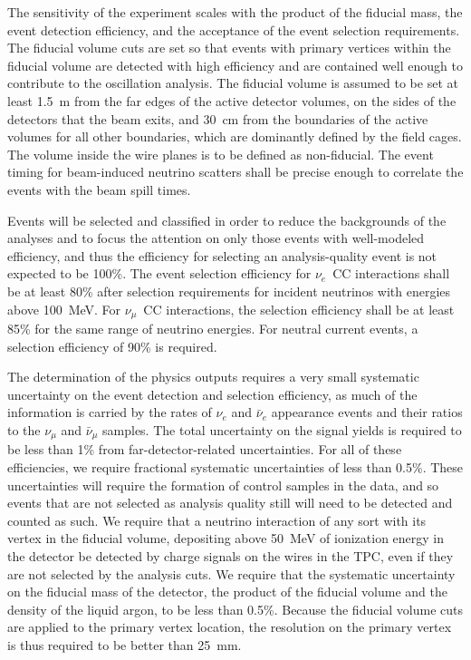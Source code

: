 The sensitivity of the experiment scales with the product of the
fiducial mass, the event detection efficiency, and the acceptance of
the event selection requirements.  The fiducial volume cuts are set so
that events with primary vertices within the fiducial volume are
detected with high efficiency and are contained well enough to
contribute to the oscillation analysis.  The fiducial volume is
assumed to be set at least 1.5~m from the far edges of the active
detector volumes, on the sides of the detectors that the beam exits,
and 30~cm from the boundaries of the active volumes for all other
boundaries, which are dominantly defined by the field cages.  The
volume inside the wire planes is to be defined as non-fiducial.
The event timing for beam-induced neutrino scatters
shall be precise enough to correlate the events with the
beam spill times.  %


Events will be selected and classified in order to reduce the
backgrounds of the analyses and to focus the attention on only those
events with well-modeled efficiency, and thus the efficiency for
selecting an analysis-quality event is not expected to be 100\%.  The
event selection efficiency for $\nu_e$~CC interactions shall be at
least 80\% after selection requirements for incident neutrinos with
energies above 100~MeV.  For $\nu_\mu$~CC interactions, the selection
efficiency shall be at least 85\% for the same range of neutrino
energies.  For neutral current events, a selection efficiency of 90\%
is required.

The determination of the physics outputs requires a very small
systematic uncertainty on the event detection and selection
efficiency, as much of the information is carried by the rates of
$\nu_e$ and $\bar\nu_e$ appearance events and their ratios to the
$\nu_\mu$ and $\bar\nu_\mu$ samples.  The total uncertainty on the
signal yields is required to be less than 1\% from
far-detector-related uncertainties.  For all of these efficiencies, we
require fractional systematic uncertainties of less than 0.5\%.  These
uncertainties will require the formation of control samples in the
data, and so events that are not selected as analysis quality still will
need to be detected and counted as such.  We require that a neutrino
interaction of any sort with its vertex in the fiducial volume,
depositing above 50~MeV of ionization energy in the detector be
detected by charge signals on the wires in the TPC, even if they are
not selected by the analysis cuts.  We require that the systematic
uncertainty on the fiducial mass of the detector, the product of the
fiducial volume and the density of the liquid argon, to be less than
0.5\%.  Because the fiducial volume cuts are applied to the primary
vertex location, the resolution on the primary vertex is thus required
to be better than 25~mm.


